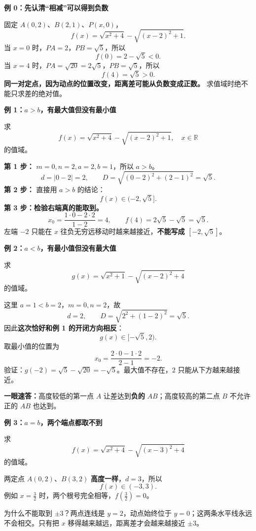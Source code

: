 \clearpage
\begin{examplebox}
	\textbf{\textcolor{CExample}{例 0：先认清“相减”可以得到负数}}



	固定 $A(0,2)$、$B(2,1)$、$P(x,0)$，
	\[
		f(x)=\sqrt{x^2+4}-\sqrt{(x-2)^2+1}.
	\]
	当 $x=0$ 时，$PA=2$，$PB=\sqrt5$，所以
	\[
		f(0)=2-\sqrt5<0.
	\]
	当 $x=4$ 时，$PA=\sqrt{20}=2\sqrt5$，$PB=\sqrt5$，所以
	\[
		f(4)=\sqrt5>0.
	\]
	\textbf{同一对定点，因为动点的位置改变，距离差可能从负数变成正数。} 求值域时绝不能只求差的绝对值。
	
\end{examplebox}
\clearpage
\begin{examplebox}
	\textbf{\textcolor{CExample}{例 1：$a>b$，有最大值但没有最小值}}



	求
	\[
		f(x)=\sqrt{x^2+4}-\sqrt{(x-2)^2+1},\quad x\in\mathbb R
	\]
	的值域。

	\textbf{第 1 步：} $m=0,n=2,a=2,b=1$，所以 $a>b$。
	\[
		d=|0-2|=2,\qquad
		D=\sqrt{(0-2)^2+(2-1)^2}=\sqrt5.
	\]
	\textbf{第 2 步：} 直接用 $a>b$ 的结论：
	\[
		\boxed{f(x)\in(-2,\sqrt5]}.
	\]
	\textbf{第 3 步：检验右端真的能取到。}
	\[
		x_0=\frac{1\cdot0-2\cdot2}{1-2}=4,
		\qquad f(4)=2\sqrt5-\sqrt5=\sqrt5.
	\]
	左端 $-2$ 只能在 $x$ 往负无穷远移动时越来越接近，\textbf{不能写成 $[-2,\sqrt5]$}。
\end{examplebox}
\clearpage
\begin{examplebox}
	\textbf{\textcolor{CExample}{例 2：$a<b$，有最小值但没有最大值}}



	求
	\[
		g(x)=\sqrt{x^2+1}-\sqrt{(x-2)^2+4}
	\]
	的值域。

	这里 $a=1<b=2$，$m=0,n=2$，故
	\[
		d=2,\qquad D=\sqrt{2^2+(1-2)^2}=\sqrt5.
	\]
	因此\textbf{这次恰好和例 1 的开闭方向相反}：
	\[
		\boxed{g(x)\in[-\sqrt5,2)}.
	\]
	取最小值的位置为
	\[
		x_0=\frac{2\cdot0-1\cdot2}{2-1}=-2.
	\]
	验证：$g(-2)=\sqrt5-\sqrt{20}=-\sqrt5$。最大值不存在，$2$ 只能从下方越来越接近。

	\textbf{一眼速答：}高度较低的第一点 $A$ 让差达到\textbf{负的} $AB$；高度较高的第二点 $B$ 不允许正的 $AB$ 也达到。
\end{examplebox}
\clearpage
\begin{examplebox}
	\textbf{\textcolor{CExample}{例 3：$a=b$，两个端点都取不到}}



	求
	\[
		f(x)=\sqrt{x^2+4}-\sqrt{(x-3)^2+4}
	\]
	的值域。

	两定点 $A(0,2)$、$B(3,2)$ \textbf{高度一样}，$d=3$，所以
	\[
		\boxed{f(x)\in(-3,3)}.
	\]
	例如 $x=\tfrac32$ 时，两个根号完全相等，$f(\tfrac32)=0$。

	为什么不能取到 $\pm3$？两点连线是 $y=2$，动点始终位于 $y=0$；这两条水平线永远不会相交。只有把 $x$ 移得越来越远，距离差才会越来越接近 $\pm3$。
	
\end{examplebox}
